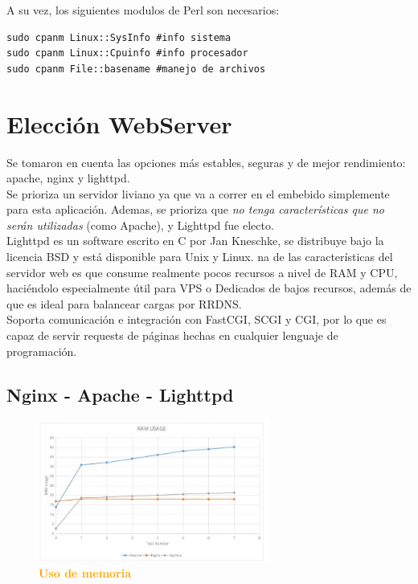 \documentclass{article}
\begin{document}
A su vez, los siguientes modulos de Perl son necesarios:
\begin{lstlisting}[style=PerlStyle]
sudo cpanm Linux::SysInfo #info sistema
sudo cpanm Linux::Cpuinfo #info procesador
sudo cpanm File::basename #manejo de archivos
\end{lstlisting}

\section{Elección WebServer}

Se tomaron en cuenta las opciones más estables, seguras y de mejor rendimiento: apache, nginx y lighttpd. \\

Se prioriza un servidor liviano ya que va a correr en el embebido simplemente para esta aplicación. Ademas, se prioriza que \textit{no tenga características que no serán utilizadas} (como Apache), y Lighttpd fue electo. \\

Lighttpd es un software escrito en C por Jan Kneschke, se distribuye bajo la licencia BSD y está disponible para Unix y Linux. na de las características del servidor web es que consume realmente pocos recursos a nivel de RAM y CPU, haciéndolo especialmente útil para VPS o Dedicados de bajos recursos, además de que es ideal para balancear cargas por RRDNS.\\

Soporta comunicación e integración con FastCGI, SCGI y CGI, por lo que es capaz de servir requests de páginas hechas en cualquier lenguaje de programación.\\

\subsection{Nginx - Apache - Lighttpd}
\begin{figure}[H]
    \centering
      \includegraphics[width=0.68\textwidth]{figures/r1.jpg}
       \centering
       \caption{\textbf{\textcolor{Orange}{Uso de memoria}}}       
    \end{figure}
\end{document}
